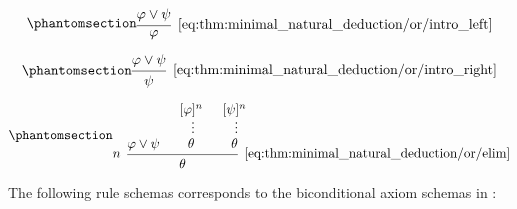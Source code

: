 \begin{proposition}
\begin{thmenum}
    \begin{minipage}{0.3\textwidth}
      \begin{equation*}\taglabel[\textrm{R} \( \vee_L^+ \)]{eq:thm:minimal_natural_deduction/or/intro_left}
        \begin{prooftree}
          \hypo{ \varphi \vee \psi }
          \infer1[\ref{eq:thm:minimal_natural_deduction/or/intro_left}]{ \varphi }
        \end{prooftree}
      \end{equation*}
    \end{minipage}
    \hfill
    \begin{minipage}{0.3\textwidth}
      \begin{equation*}\taglabel[\textrm{R} \( \vee_R^+ \)]{eq:thm:minimal_natural_deduction/or/intro_right}
        \begin{prooftree}
          \hypo{ \varphi \vee \psi }
          \infer1[\ref{eq:thm:minimal_natural_deduction/or/intro_right}]{ \psi }
        \end{prooftree}
      \end{equation*}
    \end{minipage}
    \hfill
    \begin{minipage}{0.3\textwidth}
      \begin{equation*}\taglabel[\textrm{R} \( \vee^- \)]{eq:thm:minimal_natural_deduction/or/elim}
        \begin{prooftree}
          \hypo{ \varphi \vee \psi }
          \hypo{ [\varphi]^n }
          \ellipsis {} { \theta }
          \hypo{ [\psi]^n }
          \ellipsis {} { \theta }
          \infer[left label=\( n \)]3[\ref{eq:thm:minimal_natural_deduction/or/elim}]{ \theta }
        \end{prooftree}
      \end{equation*}
    \end{minipage}

     The following rule schemas corresponds to the biconditional axiom schemas in :


\end{thmenum}
\end{proposition}
